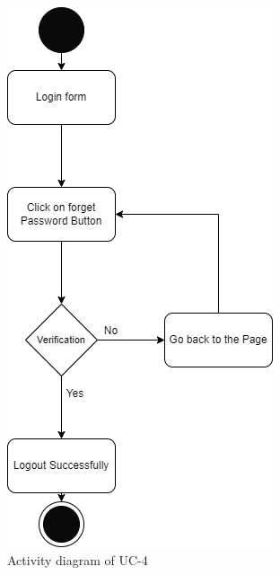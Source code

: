\begin{figure}[H]
    \centering
    \includegraphics[scale=0.7]{./diagrams/Activity Diagram/ad-04.png}
    \caption{Activity diagram of UC-4}
    \label{fig:act-04}

\end{figure}


